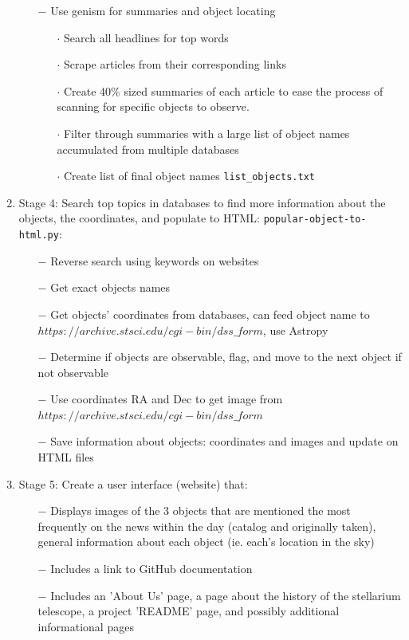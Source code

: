 \documentclass[12pt,letterpaper]{article}
\begin{document}
\begin{enumerate}[leftmargin=*]
\begin{enumerate}
            \item [$-$] Use genism for summaries and object locating
            \begin{enumerate}[leftmargin=*]
                \item[$\cdot$] Search all headlines for top words
                \item[$\cdot$] Scrape articles from their corresponding links
                \item[$\cdot$] Create 40\% sized summaries of each article to ease the process of scanning for specific objects to observe. 
                \item[$\cdot$] Filter through summaries with a large 
                  list of object names accumulated from multiple databases
                 \item[$\cdot$] Create list of final object names \texttt{list\_objects.txt}
            \end{enumerate}
        \end{enumerate}
    \item Stage 4: Search top topics in databases to find more information 
    about the objects, the coordinates, and populate to HTML: \texttt{popular-object-to-html.py}:
        \begin{enumerate}
            \item [$-$] Reverse search using keywords on websites
            \item [$-$] Get exact objects names
            \item [$-$] Get objects' coordinates from databases, can feed object 
              name to $https://archive.stsci.edu/cgi-bin/dss\_form$, use Astropy
            \item [$-$] Determine if objects are observable, flag, and move to the next object if not observable
            \item [$-$] Use coordinates RA and Dec to get image 
              from $https://archive.stsci.edu/cgi-bin/dss\_form$
            \item [$-$] Save information about objects: coordinates and images and update on HTML files
        \end{enumerate}
    \item Stage 5: Create a user interface (website) that:
    \begin{enumerate}
        \item [$-$] Displays images of the 3 objects that are mentioned the most frequently on the news within the day (catalog and originally taken),
        general information about each object (ie. each's location in the sky)
        \item [$-$] Includes a link to GitHub documentation
        \item [$-$] Includes an 'About Us' page, a page about the history of the stellarium telescope, 
          a project 'README' page, and possibly additional informational pages
    \end{enumerate}
\end{enumerate}
\end{document}
